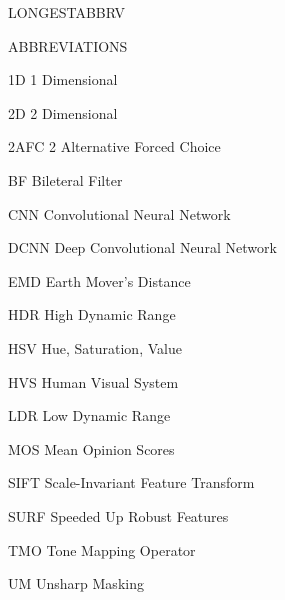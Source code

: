 \begin{theglossary}{LONGESTABBRV}
\item[ABBREVIATIONS]
\item[1D] 1 Dimensional 
\item[2D] 2 Dimensional
\item[2AFC] 2 Alternative Forced Choice
\item[BF] Bileteral Filter
\item[CNN] Convolutional Neural Network
\item[DCNN] Deep Convolutional Neural Network
\item[EMD] Earth Mover's Distance
\item[HDR] High Dynamic Range
\item[HSV] Hue, Saturation, Value
\item[HVS] Human Visual System
\item[LDR] Low Dynamic Range
\item[MOS] Mean Opinion Scores
\item[SIFT] Scale-Invariant Feature Transform
\item[SURF] Speeded Up Robust Features
\item[TMO] Tone Mapping Operator
\item[UM] Unsharp Masking

\end{theglossary}
